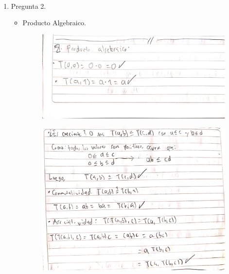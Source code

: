 \documentclass[fleqn]{article}
\begin{document}
\begin{enumerate}
     \item Pregunta 2.
     \begin{itemize}
       \item Producto Algebraico.
       \begin{figure}[H]
         \centering
         \includegraphics[scale=.5]{figs/2a1}
       \end{figure}
       \begin{figure}[H]
         \centering
         \includegraphics[scale=.5]{figs/2a2}
       \end{figure}


\end{itemize}
\end{enumerate}
\end{document}
